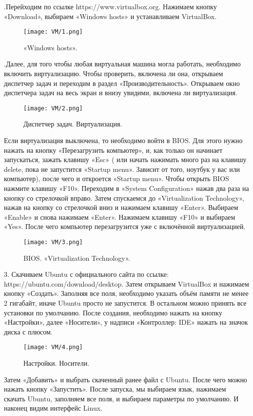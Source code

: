 .\quad Перейходим по ссылке https://www.virtualbox.org. Нажимаем кнопку «Download», выбираем «Windows hosts» и устанавливаем VirtualBox. 

\begin{figure}[h]	
		\centering
		\texttt{[image: VM/1.png]}
\caption{«Windows hosts».}
\label{ris:image}
\end{figure}

.\quad Далее, для того чтобы любая виртуальная машина могла работать, необходимо включить виртуализацию. Чтобы проверить, включена ли она, открываем диспетчер задач и переходим в раздел «Производительность». Открываем окно диспетчера задач на весь экран и внизу увидими, включена ли виртуализация.

\begin{figure}[h]
		\centering
		\texttt{[image: VM/2.png]}
\caption{Диспетчер задач. Виртуализация.}
\label{ris:image}
\end{figure}

\quad Если виртуализация выключена, то необходимо войти в BIOS. Для этого нужно нажать на кнопку «Перезагрузить компьютер», и, как только он начинает запускаться, зажать клавишу «Esc» ( или начать нажимать много раз на клавишу delete, пока не запустится «Startup menu». Зависит от того, ноутбук у вас или компьютер), после чего и откроется «Startup menu». Чтобы открыть BIOS нажмите клавишу «F10». Переходим в «System Configuration» нажав два раза на кнопку со стрелочкой вправо. Затем спускаемся до «Virtualization Technology», нажав на кнопку со стрелочкой вниз и нажимаем клавишу «Enter». Выбираем «Enable» и снова нажимаем «Enter». Нажимаем клавишу «F10» и выбираем «Yes». После чего компьютер перезагрузится уже с включённой виртуализацией.

\begin{figure}[h]
		\centering
		\texttt{[image: VM/3.png]}
\caption{BIOS. «Virtualization Technology».}
\label{ris:image}
\end{figure}

3. Скачиваем Ubuntu с официального сайта по ссылке: https://ubuntu.com/download/desktop. Затем открываем VirtualBox и нажимаем кнопку «Создать». Заполняя все поля, необходимо указать объём памяти не менее 2 гигабайт, иначе Ubuntu просто не запустится. В остальном можно принять все установки по умолчанию. После создания, необходимо нажать на кнопку «Настройки», далее «Носители», у надписи «Контроллер: IDE» нажать на значок диска с плюсом. 

\begin{figure}[h]
		\centering
		\texttt{[image: VM/4.png]}
\caption{Настройки. Носители.}
\label{ris:image}

\end{figure}

\quad Затем «Добавить» и выбрать скаченный ранее файл с Ubuntu. После чего можно нажать кнопку «Запустить». После запуска, мы выбираем язык, нажимаем скачать Ubuntu, заполняем все поля, и выбираем параметры по умолчанию. И наконец видим интерфейс Linux.
